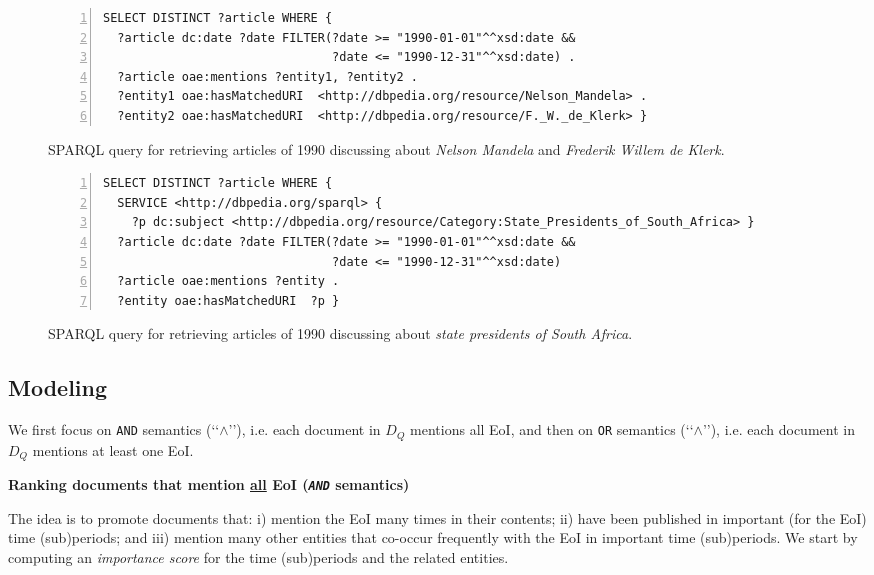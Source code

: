 \documentclass[runningheads,a4paper]{libtex/llncs}
\newcommand{\q}[1]{\lq\lq{}{}#1\rq\rq{}{}}
\begin{document}
\begin{figure}[th]
\vspace{-4mm}
\centering \scriptsize
\begin{Verbatim}[frame=lines,numbers=left,numbersep=1pt]
SELECT DISTINCT ?article WHERE {
  ?article dc:date ?date FILTER(?date >= "1990-01-01"^^xsd:date &&
                                ?date <= "1990-12-31"^^xsd:date) .
  ?article oae:mentions ?entity1, ?entity2 .
  ?entity1 oae:hasMatchedURI  <http://dbpedia.org/resource/Nelson_Mandela> .
  ?entity2 oae:hasMatchedURI  <http://dbpedia.org/resource/F._W._de_Klerk> }
\end{Verbatim}
\vspace{-5.5mm}
\caption{SPARQL query for retrieving articles of 1990 discussing
about {\em Nelson Mandela} and {\em Frederik Willem de Klerk}.}
\label{fig:modelingExampleQ1}

\centering \scriptsize
\begin{Verbatim}[frame=lines,numbers=left,numbersep=1pt]
SELECT DISTINCT ?article WHERE {
  SERVICE <http://dbpedia.org/sparql> {
    ?p dc:subject <http://dbpedia.org/resource/Category:State_Presidents_of_South_Africa> }
  ?article dc:date ?date FILTER(?date >= "1990-01-01"^^xsd:date &&
                                ?date <= "1990-12-31"^^xsd:date)
  ?article oae:mentions ?entity .
  ?entity oae:hasMatchedURI  ?p }
\end{Verbatim}
\vspace{-5.5mm}
\caption{SPARQL query for retrieving articles of 1990 discussing
about {\em state presidents of South Africa}.}
\label{fig:modelingExampleQ2}
\vspace{-4mm}
\end{figure}


\subsection{Modeling}
We first focus on {\tt AND} semantics (\q{$\wedge$}),
i.e. each document in $D_Q$ mentions all EoI,
and then on {\tt OR} semantics (\q{$\wedge$}),
i.e. each document in $D_Q$ mentions at least one EoI.

\vspace{2mm}
\noindent
{\bf Ranking documents that mention \underline{all} EoI ({\tt\em AND} semantics)}

\vspace{2mm}
\noindent
The idea is to promote documents that:
i) mention the EoI many times in their contents;
ii) have been published in important (for the EoI) time (sub)periods; and
iii) mention many other entities that co-occur frequently with the EoI in important time (sub)periods.
We start by computing an {\em importance score} for the time (sub)periods
and the related entities.
\end{document}
